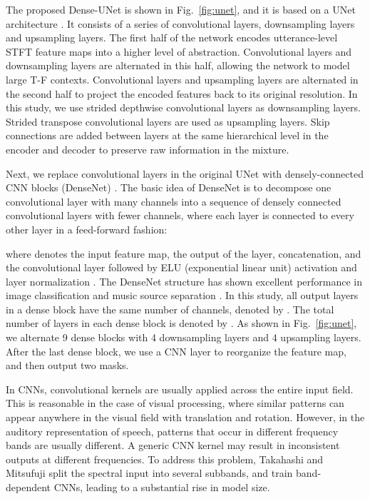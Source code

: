 \documentclass[journal]{IEEEtran}
\begin{document}
The proposed Dense-UNet is shown in Fig.~\ref{fig:unet}, and it is based on a UNet architecture \cite{UNET0}.
It consists of a series of convolutional layers, downsampling layers and upsampling layers.
The first half of the network encodes utterance-level STFT feature maps into a higher level of abstraction.
Convolutional layers and downsampling layers are alternated in this half, allowing the network to model large T-F contexts.
Convolutional layers and upsampling layers are alternated in the second half to project the encoded features back to its original resolution.
In this study, we use strided  depthwise convolutional layers \cite{depthwise} as downsampling layers. Strided transpose convolutional layers are used as upsampling layers. 
Skip connections are added between layers at the same hierarchical level in the encoder and decoder to preserve raw information in the mixture.

Next, we replace convolutional layers in the original UNet with densely-connected CNN blocks (DenseNet) \cite{DENSE}. 
The basic idea of DenseNet is to decompose one convolutional layer with many channels into a sequence of densely connected convolutional layers with fewer channels, where each layer is connected to every other layer in a feed-forward fashion:

where  denotes the input feature map,  the output of the  layer,  concatenation, and  the  convolutional layer followed by ELU (exponential linear unit) activation \cite{elu} and layer normalization \cite{ln}.
The DenseNet structure has shown excellent performance in image classification \cite{DENSE} and music source separation \cite{MM}.
In this study, all output layers  in a dense block have the same number of channels, denoted by . 
The total number of layers in each dense block is denoted by .
As shown in Fig.~\ref{fig:unet}, we alternate 9 dense blocks with 4 downsampling layers and 4 upsampling layers.
After the last dense block, we use a  CNN layer to reorganize the feature map, and then output two masks.



In CNNs, convolutional kernels are usually applied across the entire input field. This is reasonable in the case of visual processing, where similar patterns can appear anywhere in the visual field with translation and rotation.
However, in the auditory representation of speech, patterns that occur in different frequency bands are usually different.
A generic CNN kernel may result in inconsistent outputs at different frequencies.
To address this problem, Takahashi and Mitsufuji \cite{MM} split the spectral input into several subbands, and train band-dependent CNNs, leading to a substantial rise in model size. 
\end{document}
